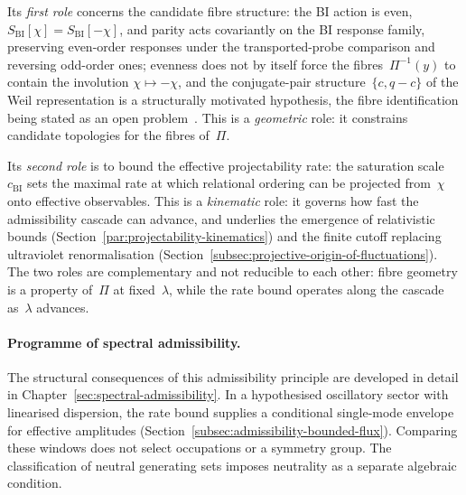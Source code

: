     Its \emph{first role} concerns the candidate fibre structure: the BI action is
    even, $S_{\mathrm{BI}}[\chi] = S_{\mathrm{BI}}[-\chi]$, and parity acts
    covariantly on the BI response family, preserving even-order responses under the
    transported-probe comparison and reversing odd-order ones; evenness does not by
    itself force the fibres~$\Pi^{-1}(y)$ to contain
    the involution $\chi \mapsto -\chi$, and the conjugate-pair
    structure~$\{c, q{-}c\}$ of the Weil representation is a structurally motivated
    hypothesis, the fibre identification being stated as an open
    problem~\cite{Beau2026a22}.
    This is a \emph{geometric} role: it constrains candidate topologies for the
    fibres of~$\Pi$.

    Its \emph{second role} is to bound the effective projectability rate: the
    saturation scale~$c_{\mathrm{BI}}$ sets the maximal rate at which relational
    ordering can be projected from~$\chi$ onto effective observables.
    This is a \emph{kinematic} role: it governs how fast the admissibility
    cascade can advance, and underlies the emergence of relativistic bounds
    (Section~\ref{par:projectability-kinematics}) and the finite cutoff
    replacing ultraviolet renormalisation (Section~\ref{subsec:projective-origin-of-fluctuations}).
    The two roles are complementary and not reducible to each other: fibre
    geometry is a property of~$\Pi$ at fixed~$\lambda$, while the rate bound
    operates along the cascade as~$\lambda$ advances.

  \paragraph{Programme of spectral admissibility.}
    The structural consequences of this admissibility principle are
    developed in detail in Chapter~\ref{sec:spectral-admissibility}.
    In a hypothesised oscillatory sector with linearised dispersion, the rate bound supplies a
    conditional single-mode envelope for effective amplitudes
    (Section~\ref{subsec:admissibility-bounded-flux}).
    Comparing these windows does not select occupations or a symmetry group.
    The classification of neutral generating sets imposes neutrality as a separate algebraic condition.
